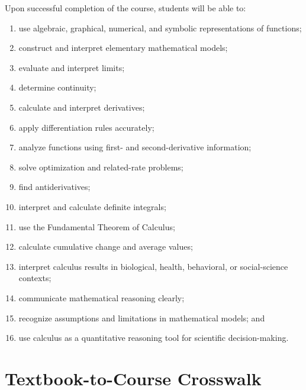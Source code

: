 \documentclass[11pt]{article}
\begin{document}
Upon successful completion of the course, students will be able to:

\begin{enumerate}
    \item use algebraic, graphical, numerical, and symbolic representations
          of functions;
    \item construct and interpret elementary mathematical models;
    \item evaluate and interpret limits;
    \item determine continuity;
    \item calculate and interpret derivatives;
    \item apply differentiation rules accurately;
    \item analyze functions using first- and second-derivative information;
    \item solve optimization and related-rate problems;
    \item find antiderivatives;
    \item interpret and calculate definite integrals;
    \item use the Fundamental Theorem of Calculus;
    \item calculate cumulative change and average values;
    \item interpret calculus results in biological, health, behavioral, or
          social-science contexts;
    \item communicate mathematical reasoning clearly;
    \item recognize assumptions and limitations in mathematical models; and
    \item use calculus as a quantitative reasoning tool for scientific
          decision-making.
\end{enumerate}

\section{Textbook-to-Course Crosswalk}
\end{document}
